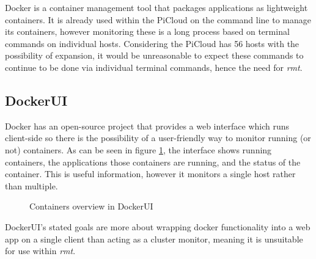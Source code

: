 \label{sec:docker}
Docker \citep{docker} is a container management tool that packages applications as lightweight containers.
It is already used within the PiCloud on the command line to manage its containers, however monitoring these is a long process based on terminal commands on individual hosts.
Considering the PiCloud has 56 hosts with the possibility of expansion, it would be unreasonable to expect these commands to continue to be done via individual terminal commands, hence the need for \emph{rmt}.
 
 \subsection{DockerUI}
 Docker has an open-source project that provides a web interface which runs client-side so there is the possibility of a user-friendly way to monitor running (or not) containers.
 As can be seen in figure \ref{fig:dockerUiContainers}, the interface shows running containers, the applications those containers are running, and the status of the container.
 This is useful information, however it monitors a single host rather than multiple.

 \begin{figure}[t]
 	\centering
	\setlength\fboxsep{0pt}
	\setlength\fboxrule{0.5pt}
 	\caption{Containers overview in DockerUI}
 	\label{fig:dockerUiContainers}
 \end{figure}

 DockerUI's stated goals are more about wrapping docker functionality into a web app on a single client than acting as a cluster monitor, meaning it is unsuitable for use within \emph{rmt}.
